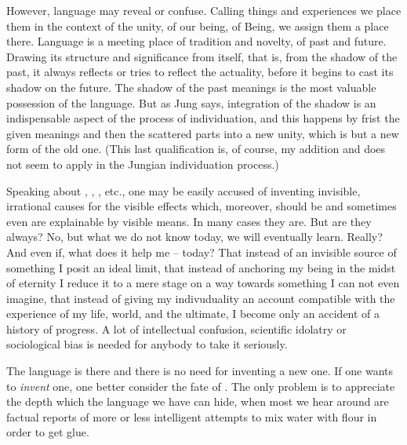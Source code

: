 However, language may reveal or confuse.  Calling things and
experiences we place them in the context of the unity, of our 
being, of Being,  we
assign them a place there.  Language is a meeting place of tradition
and novelty, of past and future.  Drawing its structure and
significance from itself, that is, from the shadow of the past, it
always reflects or tries to reflect the actuality, before it begins to
cast its shadow on the future. The shadow of the past meanings is the 
most valuable possession of the language. But as Jung says, integration of 
the shadow is an indispensable aspect of the process of individuation, 
and this happens by frist  the given meanings and then 
 the scattered parts into a new unity, which is but a 
new form of the old one. (This last qualification is, of course, my 
addition and does not seem to apply in the Jungian individuation 
process.)


Speaking about , , ,
etc., one may be easily accused of inventing invisible, irrational
causes for the visible effects which, moreover, should be and
sometimes even are explainable by visible means.  In many cases they
are.  But are they always?  No, but what we do not know today, we will
eventually learn.  Really?  And even if, what does it help me --
today?  That instead of an invisible source of something I posit an
ideal limit, that instead of anchoring my being in the midst of
eternity I reduce it to a mere stage on a way towards something I can
not even imagine, that instead of giving my indivuduality an account
compatible with the experience of my life, world, and the ultimate, I
become only an accident of a history of progress.  A lot of
intellectual confusion, scientific idolatry or sociological bias is
needed for anybody to take it seriously.

\pa
The language is there and there is no need for inventing a new one. 
If one wants to {\em invent} one, one better consider the fate of
.  The only problem is to appreciate the depth which the
language we have can hide, when most we hear around are factual 
reports of more or less intelligent attempts to mix water with flour 
in order to get glue.

